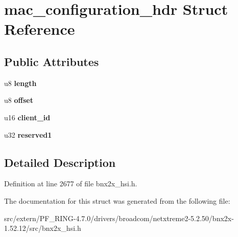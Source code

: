 \hypertarget{structmac__configuration__hdr}{
\section{mac\_\-configuration\_\-hdr Struct Reference}
\label{structmac__configuration__hdr}
}
\subsection*{Public Attributes}
\begin{DoxyCompactItemize}
\item 
\hypertarget{structmac__configuration__hdr_a24f5dcffc247af967bdf5429a1426d7b}{
u8 {\bfseries length}}
\label{structmac__configuration__hdr_a24f5dcffc247af967bdf5429a1426d7b}

\item 
\hypertarget{structmac__configuration__hdr_a7aa381fdea104d30d1e3109aa149f755}{
u8 {\bfseries offset}}
\label{structmac__configuration__hdr_a7aa381fdea104d30d1e3109aa149f755}

\item 
\hypertarget{structmac__configuration__hdr_a75b907ac989135d96aca0bb9862dbed7}{
u16 {\bfseries client\_\-id}}
\label{structmac__configuration__hdr_a75b907ac989135d96aca0bb9862dbed7}

\item 
\hypertarget{structmac__configuration__hdr_a0635a6d4c10e5a8f6d0de5194ebbd1d3}{
u32 {\bfseries reserved1}}
\label{structmac__configuration__hdr_a0635a6d4c10e5a8f6d0de5194ebbd1d3}

\end{DoxyCompactItemize}


\subsection{Detailed Description}


Definition at line 2677 of file bnx2x\_\-hsi.h.



The documentation for this struct was generated from the following file:\begin{DoxyCompactItemize}
\item 
src/extern/PF\_\-RING-\/4.7.0/drivers/broadcom/netxtreme2-\/5.2.50/bnx2x-\/1.52.12/src/bnx2x\_\-hsi.h\end{DoxyCompactItemize}
